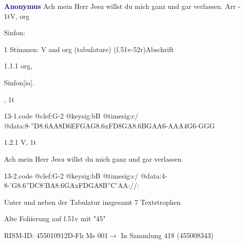 \documentclass[twocolumn]{book}
\begin{document}
\par \vspace{7pt} \textcolor{darkblue}{\textbf{Anonymus  }}\hfillplus{\textbf{[13]}}\newline Ach mein Herr Jesu willst du mich ganz und gar verlassen. Arr - 1t\newline V, org
\par \begin{itshape}[f.51v, at left:] Sinfon:\end{itshape} 
\par \textcolor{darkblue}{}  1 Stimmen: V and org (tabulature)  (f.51v-52r)\newline Abschrift
\par 1.1.1  org, \begin{itshape}Sinfon[ia].\end{itshape}, 1t  
\begin{filecontents*}{13-1.code}
@clef:G-2
@keysig:bB
@timesig:c/
@data:8-''D{8.6AA8D6EF}{GAG8.6xFD}{8GA8.6BG}{AA}6-A{AA}4G6-{GGG}
\end{filecontents*}
\newline
%
\par 1.2.1  V, 1t\newline \begin{footnotesize} Ach mein Herr Jesu willst du mich ganz und gar verlassen \end{footnotesize}  
\begin{filecontents*}{13-2.code}
@clef:G-2
@keysig:bB
@timesig:c/
@data:4-8-'G{8.6''DC8'BA}{8.6GAxFD}{GA8B''C}{'AA}://:
\end{filecontents*}
\newline
%
\par Unter und neben der Tabulatur insgesamt 7 Textstrophen
\par Alte Foliierung auf f.51v mit "45"
\par RISM-ID: 455010912\newline D-Fh  Ms 001\newline $\rightarrow$ In Sammlung 418 (455008343)
      
\end{document}

